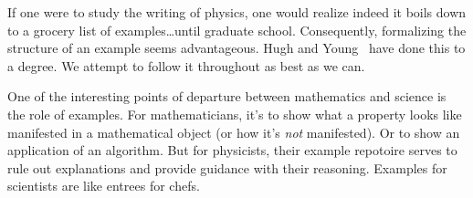 If one were to study the writing of physics, one would realize indeed it
boils down to a grocery list of examples\dots until graduate
school. Consequently, formalizing the structure of an example seems
advantageous. Hugh and Young~\cite{young} have done this to a degree. We
attempt to follow it throughout as best as we can.

One of the interesting points of departure between mathematics and
science is the role of examples. For mathematicians, it's to show what a
property looks like manifested in a mathematical object (or how it's
\emph{not} manifested). Or to show an application of an algorithm. But
for physicists, their example repotoire serves to rule out explanations
and provide guidance with their reasoning. Examples for scientists are
like entrees for chefs. 

\vfil
{}
